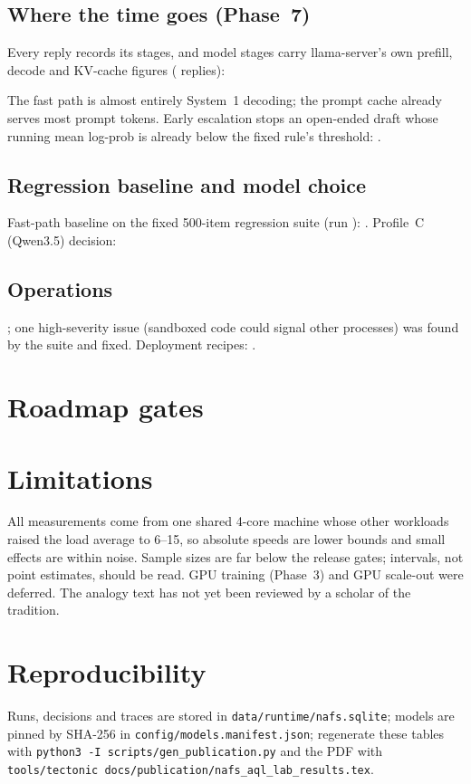 \documentclass[11pt]{article}
\begin{document}
\subsection{Where the time goes (Phase~7)}
Every reply records its stages, and model stages carry llama-server's own prefill, decode and KV-cache figures (\StageReplies{} replies):
\begin{center}\StageTable\end{center}
\begin{center}\EngineTable\end{center}
The fast path is almost entirely System~1 decoding; the prompt cache already serves most prompt tokens. Early escalation stops an open-ended draft whose running mean log-prob is already below the fixed rule's threshold: \EarlyEscSummary.
\begin{center}\EarlyEscTable\end{center}

\subsection{Regression baseline and model choice}
Fast-path baseline on the fixed 500-item regression suite (run \RegressionRun): \RegressionSummary. Profile~C (Qwen3.5) decision: \ProfileCDecision
\begin{center}\ProfileCTable\end{center}

\subsection{Operations}
\SecuritySummary; one high-severity issue (sandboxed code could signal other processes) was found by the suite and fixed. Deployment recipes: \DeploySummary.

\section{Roadmap gates}
\begin{center}\small\GatesTable\end{center}

\section{Limitations}
All measurements come from one shared 4-core machine whose other workloads raised the load average to 6--15, so absolute speeds are lower bounds and small effects are within noise. Sample sizes are far below the release gates; intervals, not point estimates, should be read. GPU training (Phase~3) and GPU scale-out were deferred. The analogy text has not yet been reviewed by a scholar of the tradition.

\section{Reproducibility}
Runs, decisions and traces are stored in \texttt{data/runtime/nafs.sqlite}; models are pinned by SHA-256 in \texttt{config/models.manifest.json}; regenerate these tables with \texttt{python3 -I scripts/gen\_publication.py} and the PDF with \texttt{tools/tectonic docs/publication/nafs\_aql\_lab\_results.tex}.
\end{document}
